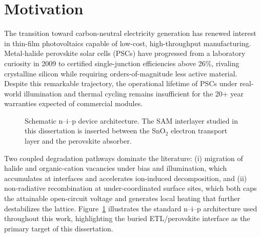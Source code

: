 \section{Motivation}

The transition toward carbon-neutral electricity generation has renewed
interest in thin-film photovoltaics capable of low-cost, high-throughput
manufacturing. Metal-halide perovskite solar cells (PSCs) have progressed
from a laboratory curiosity in 2009 to certified single-junction
efficiencies above 26\%, rivaling crystalline silicon while requiring
orders-of-magnitude less active material. Despite this remarkable
trajectory, the operational lifetime of PSCs under real-world illumination
and thermal cycling remains insufficient for the 20+ year warranties
expected of commercial modules.

\begin{figure}[htbp]
\centering
{}
\caption{Schematic n--i--p device architecture. The SAM interlayer studied
in this dissertation is inserted between the SnO$_2$ electron transport
layer and the perovskite absorber.}
\label{fig:device-stack}
\end{figure}

Two coupled degradation pathways dominate the literature: (i) migration of
halide and organic-cation vacancies under bias and illumination, which
accumulates at interfaces and accelerates ion-induced decomposition, and
(ii) non-radiative recombination at under-coordinated surface sites, which
both caps the attainable open-circuit voltage and generates local heating
that further destabilizes the lattice. Figure~\ref{fig:device-stack}
illustrates the standard n--i--p architecture used throughout this work,
highlighting the buried ETL/perovskite interface as the primary target of
this dissertation.

